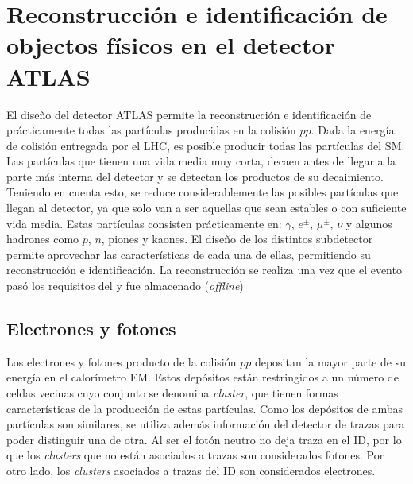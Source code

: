 \chapter{Reconstrucción e identificación de objectos físicos en el detector ATLAS} %
 



El diseño del detector ATLAS permite la reconstrucción e identificación de prácticamente todas las
partículas producidas en la colisión $pp$. Dada la energía de colisión entregada por el LHC, es
posible producir todas las partículas del SM. Las partículas que tienen una vida media muy corta,
decaen antes de llegar a la parte más interna del detector y se detectan los productos de su
decaimiento. Teniendo en cuenta esto, se reduce considerablemente las posibles partículas que llegan
al detector, ya que solo van a ser aquellas que sean estables o con suficiente vida media. Estas
partículas consisten prácticamente en: $\gamma$, $e^{\pm}$, $\mu^{\pm}$, $\nu$ y algunos hadrones
como $p$, $n$, piones y kaones. El diseño de los distintos subdetector permite aprovechar las
características de cada una de ellas, permitiendo su reconstrucción e identificación. La
reconstrucción se realiza una vez que el evento pasó los requisitos del \trigger y fue almacenado
(\textit{offline}) 



\section{Electrones y fotones}


Los electrones y fotones producto de la colisión $pp$ depositan la mayor parte de su energía en el calorímetro EM. Estos depósitos están restringidos a un número de celdas vecinas cuyo conjunto se denomina \textit{cluster}, que tienen formas características de la producción de estas partículas. Como los depósitos de ambas partículas son similares, se utiliza además información del detector de trazas para poder distinguir una de otra. Al ser el fotón neutro no deja traza en el ID, por lo que los \textit{clusters} que no están asociados a trazas son considerados fotones. Por otro lado, los \textit{clusters} asociados a trazas del ID son considerados electrones. 

